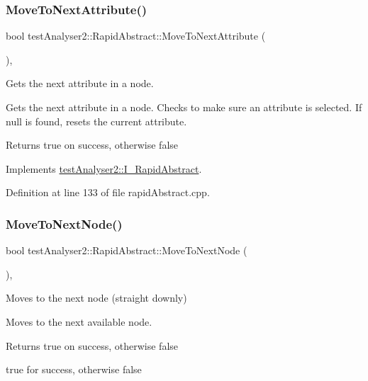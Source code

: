 \subsubsection{\texorpdfstring{MoveToNextAttribute()}{MoveToNextAttribute()}}
{\footnotesize\ttfamily bool test\+Analyser2\+::\+Rapid\+Abstract\+::\+Move\+To\+Next\+Attribute (\begin{DoxyParamCaption}{ }\end{DoxyParamCaption})\hspace{0.3cm}{\ttfamily [override]}, {\ttfamily [virtual]}}



Gets the next attribute in a node. 

Gets the next attribute in a node. Checks to make sure an attribute is selected. If null is found, resets the current attribute.

\begin{DoxyReturn}{Returns}
true on success, otherwise false 
\end{DoxyReturn}


Implements \mbox{\hyperlink{classtestAnalyser2_1_1I__RapidAbstract_ab26e1f2ca674a3bc10b0a5b71c9a5941}{test\+Analyser2\+::\+I\+\_\+\+Rapid\+Abstract}}.



Definition at line 133 of file rapid\+Abstract.\+cpp.

\mbox{\label{classtestAnalyser2_1_1RapidAbstract_a49c72b683d3c31e7aca432de5d97711c}} 
\subsubsection{\texorpdfstring{MoveToNextNode()}{MoveToNextNode()}}
{\footnotesize\ttfamily bool test\+Analyser2\+::\+Rapid\+Abstract\+::\+Move\+To\+Next\+Node (\begin{DoxyParamCaption}{ }\end{DoxyParamCaption})\hspace{0.3cm}{\ttfamily [override]}, {\ttfamily [virtual]}}



Moves to the next node (straight downly) 

Moves to the next available node.

\begin{DoxyReturn}{Returns}
true on success, otherwise false

true for success, otherwise false 
\end{DoxyReturn}


